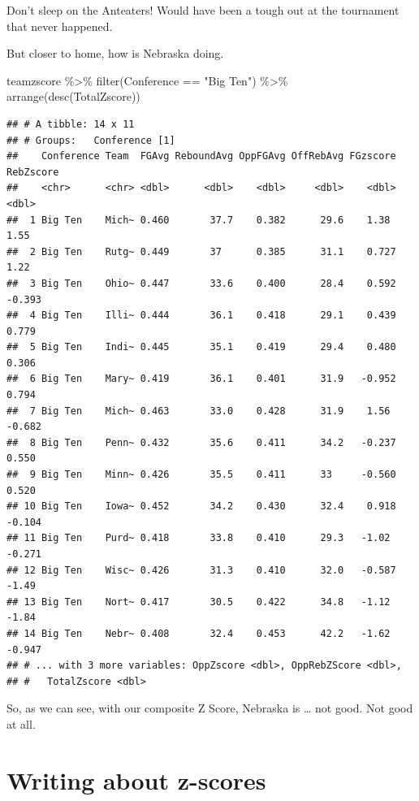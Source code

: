 \documentclass[
]{book}
\newenvironment{Shaded}{\begin{snugshade}}{\end{snugshade}}
\newcommand{\FunctionTok}[1]{\textcolor[rgb]{0.00,0.00,0.00}{#1}}
\newcommand{\NormalTok}[1]{#1}
\newcommand{\SpecialCharTok}[1]{\textcolor[rgb]{0.00,0.00,0.00}{#1}}
\newcommand{\StringTok}[1]{\textcolor[rgb]{0.31,0.60,0.02}{#1}}
\begin{document}
Don't sleep on the Anteaters! Would have been a tough out at the tournament that never happened.

But closer to home, how is Nebraska doing.

\begin{Shaded}
\begin{Highlighting}[]
\NormalTok{teamzscore }\SpecialCharTok{\%\textgreater{}\%} 
  \FunctionTok{filter}\NormalTok{(Conference }\SpecialCharTok{==} \StringTok{"Big Ten"}\NormalTok{) }\SpecialCharTok{\%\textgreater{}\%} 
  \FunctionTok{arrange}\NormalTok{(}\FunctionTok{desc}\NormalTok{(TotalZscore))}
\end{Highlighting}
\end{Shaded}

\begin{verbatim}
## # A tibble: 14 x 11
## # Groups:   Conference [1]
##    Conference Team  FGAvg ReboundAvg OppFGAvg OffRebAvg FGzscore RebZscore
##    <chr>      <chr> <dbl>      <dbl>    <dbl>     <dbl>    <dbl>     <dbl>
##  1 Big Ten    Mich~ 0.460       37.7    0.382      29.6    1.38      1.55 
##  2 Big Ten    Rutg~ 0.449       37      0.385      31.1    0.727     1.22 
##  3 Big Ten    Ohio~ 0.447       33.6    0.400      28.4    0.592    -0.393
##  4 Big Ten    Illi~ 0.444       36.1    0.418      29.1    0.439     0.779
##  5 Big Ten    Indi~ 0.445       35.1    0.419      29.4    0.480     0.306
##  6 Big Ten    Mary~ 0.419       36.1    0.401      31.9   -0.952     0.794
##  7 Big Ten    Mich~ 0.463       33.0    0.428      31.9    1.56     -0.682
##  8 Big Ten    Penn~ 0.432       35.6    0.411      34.2   -0.237     0.550
##  9 Big Ten    Minn~ 0.426       35.5    0.411      33     -0.560     0.520
## 10 Big Ten    Iowa~ 0.452       34.2    0.430      32.4    0.918    -0.104
## 11 Big Ten    Purd~ 0.418       33.8    0.410      29.3   -1.02     -0.271
## 12 Big Ten    Wisc~ 0.426       31.3    0.410      32.0   -0.587    -1.49 
## 13 Big Ten    Nort~ 0.417       30.5    0.422      34.8   -1.12     -1.84 
## 14 Big Ten    Nebr~ 0.408       32.4    0.453      42.2   -1.62     -0.947
## # ... with 3 more variables: OppZscore <dbl>, OppRebZScore <dbl>,
## #   TotalZscore <dbl>
\end{verbatim}

So, as we can see, with our composite Z Score, Nebraska is \ldots{} not good. Not good at all.

\hypertarget{writing-about-z-scores}{%
\section{Writing about z-scores}\label{writing-about-z-scores}}
\end{document}
